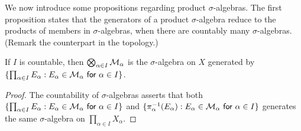 We now introduce some propositions regarding product $\sigma$-algebras.
The first proposition states that the generators of a product $\sigma$-algebra reduce to the products of members in $\sigma$-algebras, when there are countably many $\sigma$-algebras.
(Remark the counterpart in the topology.)
\begin{prop}
    If $I$ is countable, then $\bigotimes_{\alpha\in I}{\mathcal{M}}_\alpha$ is the $\sigma$-algebra on $X$ generated by $\{\prod_{\alpha\in I} E_\alpha : \textsf{$E_\alpha\in{\mathcal{M}}_\alpha$ for $\alpha\in I$}\}$.
\end{prop}
\begin{proof}
    The countability of $\sigma$-algebras asserts that both $\{\prod_{\alpha\in I} E_\alpha : \textsf{$E_\alpha\in{\mathcal{M}}_\alpha$ for $\alpha\in I$}\}$ and $\{\pi_\alpha^{-1}(E_\alpha): \textsf{$E_\alpha\in{\mathcal{M}}_\alpha$ for $\alpha\in I$}\}$ generates the same $\sigma$-algebra on $\prod_{\alpha\in I} X_\alpha$.
\end{proof}

